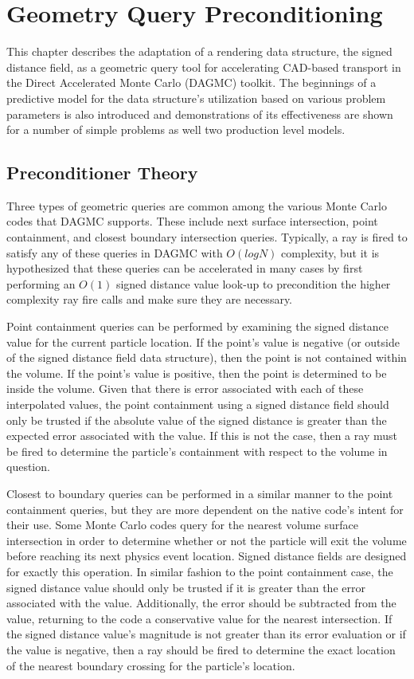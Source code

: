 
\chapter{Geometry Query Preconditioning}\label{ch:preconditioning}

This chapter describes the adaptation of a rendering data structure, the signed
distance field, as a geometric query tool for accelerating CAD-based transport
in the Direct Accelerated Monte Carlo (DAGMC) toolkit. The beginnings of a
predictive model for the data structure's utilization based on various problem
parameters is also introduced and demonstrations of its effectiveness are shown
for a number of simple problems as well two production level models.

\section{Preconditioner Theory}\label{section:preconditioner_theory}

Three types of geometric queries are common among the various Monte Carlo codes
that DAGMC supports. These include next surface intersection, point containment,
and closest boundary intersection queries. Typically, a ray is fired to satisfy
any of these queries in DAGMC with $O(logN)$ complexity, but it is hypothesized
that these queries can be accelerated in many cases by first performing an
$O(1)$ signed distance value look-up to precondition the higher complexity ray
fire calls and make sure they are necessary.

Point containment queries can be performed by examining the signed distance
value for the current particle location. If the point's value is negative (or
outside of the signed distance field data structure), then the point is not
contained within the volume. If the point's value is positive, then the point is
determined to be inside the volume. Given that there is error associated with
each of these interpolated values, the point containment using a signed distance
field should only be trusted if the absolute value of the signed distance is
greater than the expected error associated with the value. If this is not the
case, then a ray must be fired to determine the particle's containment with
respect to the volume in question.

Closest to boundary queries can be performed in a similar manner to the point
containment queries, but they are more dependent on the native code's intent for
their use. Some Monte Carlo codes query for the nearest volume surface
intersection in order to determine whether or not the particle will exit the
volume before reaching its next physics event location. Signed distance fields are
designed for exactly this operation. In similar fashion to the point
containment case, the signed distance value should only be trusted if it is greater than the
error associated with the value. Additionally, the error should be subtracted
from the value, returning to the code a conservative value for the nearest
intersection. If the signed distance value's magnitude is not greater than its
error evaluation or if the value is negative, then a ray should be fired to
determine the exact location of the nearest boundary crossing for the particle's
location.

